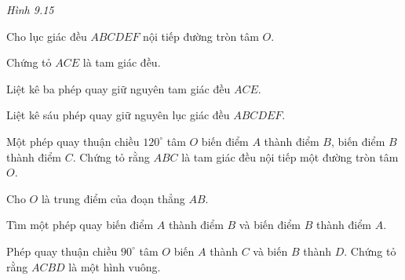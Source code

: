 \begin{practice}
\begin{questions}[resume=SBT]
\begin{center}
            \textit{Hình 9.15}
        \end{center}

        \answerline
        \answerline

        \item Cho lục giác đều $ABCDEF$ nội tiếp đường tròn tâm $O$.
        \begin{questions}
            \item Chứng tỏ $ACE$ là tam giác đều.

            \answerline
            \answerline
            \item Liệt kê ba phép quay giữ nguyên tam giác đều $ACE$.

            \answerline
            \item Liệt kê sáu phép quay giữ nguyên lục giác đều $ABCDEF$.

            \answerline
        \end{questions}

        \item Một phép quay thuận chiều $120^\circ$ tâm $O$ biến điểm $A$ thành điểm $B$, biến điểm $B$ thành điểm $C$. Chứng tỏ rằng $ABC$ là tam giác đều nội tiếp một đường tròn tâm $O$.

        \answerline
        \answerline
        \answerline

        \item Cho $O$ là trung điểm của đoạn thẳng $AB$.
        \begin{questions}
            \item Tìm một phép quay biến điểm $A$ thành điểm $B$ và biến điểm $B$ thành điểm $A$.

            \answerline
            \item Phép quay thuận chiều $90^\circ$ tâm $O$ biến $A$ thành $C$ và biến $B$ thành $D$. Chứng tỏ rằng $ACBD$ là một hình vuông.

            \answerline
            \answerline
            \answerline
        \end{questions}
    \end{questions}
\end{practice}
